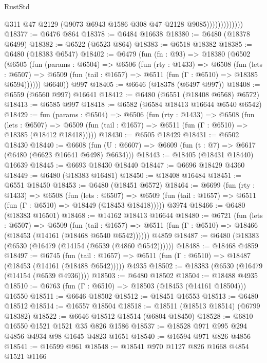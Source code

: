 \begin{lexlean}{RustStd}
\begin{coremodule}
                            @311
                            @47
                            @2129
                            (@9073 @6943 @1586 @308 @47 @2128 @9085)))))))))))))
@18377 := @6476 @864
@18378 := @6484 @16638
@18380 := @6480 (@18378 @6499)
@18382 := @6522 (@6523 @864)
@18383 := @6518 @18382
@18385 := @6480 (@18383 @6547)
@18402 := @6479
    (fun (fn : @93) =>
    @18380
      (@6502
        (@6505
          (fun (params : @6504) =>
          @6506
            (fun (rty : @1433) =>
            @6508
              (fun (lets : @6507) =>
              @6509 (fun (tail : @1657) => @6511 (fun (Γ : @6510) => @18385 @6594))))))
        @6640))
    @997
@18405 := @6646 (@18378 (@6497 @997))
@18408 := @6559 (@6560 @997) @16641
@18412 := @6480 (@6551 (@18408 @6568) @6572)
@18413 := @6585 @997
@18418 := @6582 (@6584 @18413 @16644 @6540 @6542)
@18429 := fun (params : @6504) =>
  @6506
    (fun (rty : @1433) =>
    @6508
      (fun (lets : @6507) =>
      @6509 (fun (tail : @1657) => @6511 (fun (Γ : @6510) => @18385 (@18412 @18418)))))
@18430 := @6505 @18429
@18431 := @6502 @18430
@18440 := @6608
    (fun (U : @6607) => @6609 (fun (t : @7) => @6617 (@6480 (@6623 @16641 @6498) @6634)))
@18443 := @18405 (@18431 @18440) @16639
@18445 := @6693 @18430 @18440
@18447 := @6696 @18429 @4360
@18449 := @6480 (@18383 @16481)
@18450 := @18408 @16484
@18451 := @6551 @18450
@18453 := @6480 (@18451 @6572)
@18464 := @6699
    (fun (rty : @1433) =>
    @6508
      (fun (lets : @6507) =>
      @6509 (fun (tail : @1657) => @6511 (fun (Γ : @6510) => @18449 (@18453 @18418)))))
    @3974
@18466 := @6480 (@18383 @16501)
@18468 := @14162 @18413 @16644
@18480 := @6721
    (fun (lets : @6507) =>
    @6509
      (fun (tail : @1657) =>
      @6511 (fun (Γ : @6510) => @18466 (@18453 (@14161 (@18468 @6540 @6542))))))
    @4859
@18487 := @6480 (@18383 (@6530 (@16479 (@14154 (@6539 (@4860 @6542))))))
@18488 := @18468 @4859
@18497 := @6745
    (fun (tail : @1657) => @6511 (fun (Γ : @6510) => @18487 (@18453 (@14161 (@18488 @6542)))))
    @4935
@18502 := @18383 (@6530 (@16479 (@14154 (@6539 @4936))))
@18503 := @6480 @18502
@18504 := @18488 @4935
@18510 := @6763 (fun (Γ : @6510) => @18503 (@18453 (@14161 @18504))) @16550
@18511 := @6646 @18502
@18512 := @18451 @16553
@18513 := @6480 @18512
@18514 := @16557 @18504
@18518 := @18511 (@18513 @18514) (@6799 @18382)
@18522 := @6646 @18512 @18514 (@6804 @18450)
@18528 := @6810 @16550 @1521 @1521 @35 @826 @1586
@18537 := @18528 @971 @995 @294 @4856 @4934 @98 @1645 @4823 @1651
@18540 := @16594 @971 @826 @4856
@18541 := @16599 @961
@18548 := @18541 @970 @1127 @826 @1668 @4854 @1521 @1166

\end{coremodule}
\end{lexlean}
